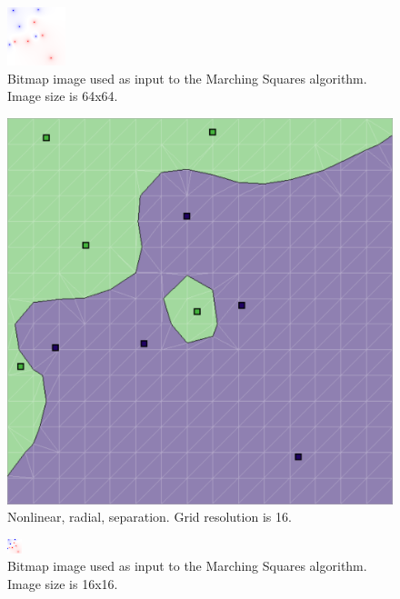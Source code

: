 \documentclass[12pt]{article}
\begin{document}
\begin{figure} 
\centering
  \includegraphics[width = 3 in]{64_res_image.png}
  \caption{Bitmap image used as input to the Marching Squares algorithm. 
Image size is 64x64.
}
\end{figure}

\begin{figure} 
\centering
  \includegraphics[width = 3 in]{16_res.png}
  \caption{Nonlinear, radial, separation. Grid resolution is 16.
}
\end{figure}

\begin{figure} 
\centering
  \includegraphics[width = 3 in]{16_res_image.png}
  \caption{Bitmap image used as input to the Marching Squares algorithm.
Image size is 16x16.
}
\end{figure}
\end{document}
